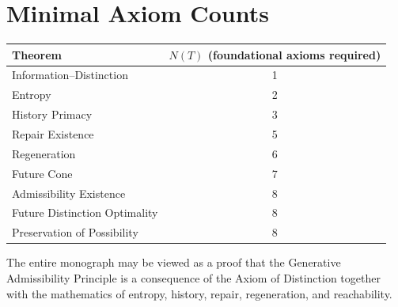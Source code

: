 \documentclass[12pt,twoside,openright]{book}
\begin{document}
\section{Minimal Axiom Counts}

\begin{center}
\begin{tabular}{lc}
\toprule
Theorem & $N(T)$ (foundational axioms required) \\
\midrule
Information--Distinction & 1 \\
Entropy & 2 \\
History Primacy & 3 \\
Repair Existence & 5 \\
Regeneration & 6 \\
Future Cone & 7 \\
Admissibility Existence & 8 \\
Future Distinction Optimality & 8 \\
Preservation of Possibility & 8 \\
\bottomrule
\end{tabular}
\end{center}

The entire monograph may be viewed as a proof that the
Generative Admissibility Principle is a consequence of
the Axiom of Distinction together with the mathematics
of entropy, history, repair, regeneration, and
reachability.

\printglossaries

\printbibliography[heading=bibintoc,title={References}]


%

\printindex
\end{document}

